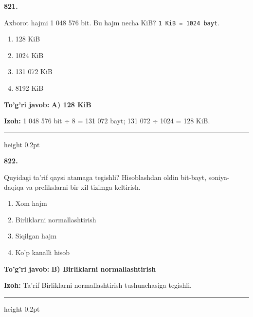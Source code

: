 \documentclass[10pt,a4paper,oneside]{article}
\begin{document}
\noindent\textbf{\color{ink}821.}
\par
Axborot hajmi 1 048 576 bit. Bu hajm necha KiB? \texttt{1 KiB = 1024 bayt}.
\begin{enumerate}[label=\Alph*),leftmargin=9mm]
\item 128 KiB
\item 1024 KiB
\item 131 072 KiB
\item 8192 KiB
\end{enumerate}
\begin{tcolorbox}[enhanced,breakable,colback=teal!4,colframe=teal!50!black,boxrule=0.5pt,arc=1.1mm,left=3mm,right=3mm,top=1.7mm,bottom=1.7mm,before skip=2mm,after skip=2mm]
\textbf{\color{teal}To'g'ri javob:} \textbf{A) 128 KiB}
\par\smallskip
\textbf{Izoh:} 1 048 576 bit \ensuremath{\div} 8 = 131 072 bayt; 131 072 \ensuremath{\div} 1024 = 128 KiB.
\end{tcolorbox}
\vspace{2mm}\hrule height 0.2pt \vspace{3mm}

\noindent\textbf{\color{ink}822.}
\par
Quyidagi ta'rif qaysi atamaga tegishli? Hisoblashdan oldin bit-bayt, soniya-daqiqa va prefikslarni bir xil tizimga keltirish.
\begin{enumerate}[label=\Alph*),leftmargin=9mm]
\item Xom hajm
\item Birliklarni normallashtirish
\item Siqilgan hajm
\item Ko'p kanalli hisob
\end{enumerate}
\begin{tcolorbox}[enhanced,breakable,colback=teal!4,colframe=teal!50!black,boxrule=0.5pt,arc=1.1mm,left=3mm,right=3mm,top=1.7mm,bottom=1.7mm,before skip=2mm,after skip=2mm]
\textbf{\color{teal}To'g'ri javob:} \textbf{B) Birliklarni normallashtirish}
\par\smallskip
\textbf{Izoh:} Ta'rif Birliklarni normallashtirish tushunchasiga tegishli.
\end{tcolorbox}
\vspace{2mm}\hrule height 0.2pt \vspace{3mm}
\end{document}
